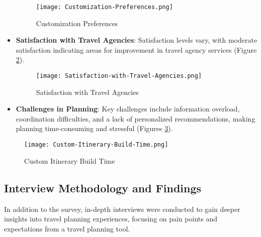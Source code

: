 \documentclass[conference]{IEEEtran}
\begin{document}
\begin{itemize}
            \begin{figure}
                \centering
                \texttt{[image: Customization-Preferences.png]}
                \caption{Customization Preferences}
                \label{fig:customization-preferences}
            \end{figure}
            \item \textbf{Satisfaction with Travel Agencies}: Satisfaction levels vary, with moderate satisfaction indicating areas for improvement in travel agency services (Figure \ref{fig:satisfaction-with-travel-agencies}).
            \begin{figure}
                \centering
                \texttt{[image: Satisfaction-with-Travel-Agencies.png]}
                \caption{Satisfaction with Travel Agencies}
                \label{fig:satisfaction-with-travel-agencies}
            \end{figure}
            \item \textbf{Challenges in Planning}: Key challenges include information overload, coordination difficulties, and a lack of personalized recommendations, making planning time-consuming and stressful (Figures \ref{fig:custom-itinerary-build-time}).
        \end{itemize}
            \begin{figure}
                \centering
                \texttt{[image: Custom-Itinerary-Build-Time.png]}
                \caption{Custom Itinerary Build Time}
                \label{fig:custom-itinerary-build-time}
            \end{figure}

    \subsection{Interview Methodology and Findings}
        In addition to the survey, in-depth interviews were conducted to gain deeper insights into travel planning experiences, focusing on pain points and expectations from a travel planning tool.
\end{document}
